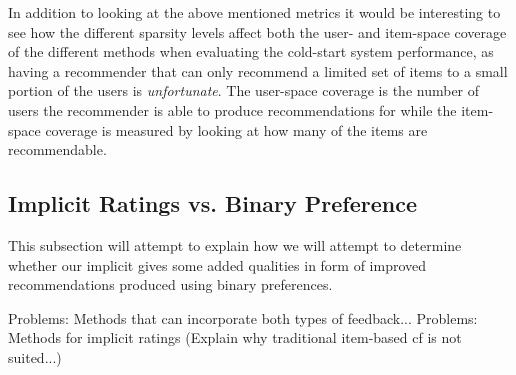 

In addition to looking at the above mentioned metrics it would be interesting to see how
the different sparsity levels affect both the user- and item-space coverage of the different
methods when evaluating the cold-start system performance, as having a recommender that can only
recommend a limited set of items to a small portion of the users is \emph{unfortunate}. The
user-space coverage is the number of users the recommender is able to produce recommendations for while the item-space
coverage is measured by looking at how many of the items are recommendable.

\subsection{Implicit Ratings vs. Binary Preference}

This subsection will attempt to explain how we will attempt to determine whether our implicit gives some added
qualities in form of improved recommendations produced using binary preferences.

Problems: Methods that can incorporate both types of feedback...
Problems: Methods for implicit ratings (Explain why traditional item-based cf is not suited...)

